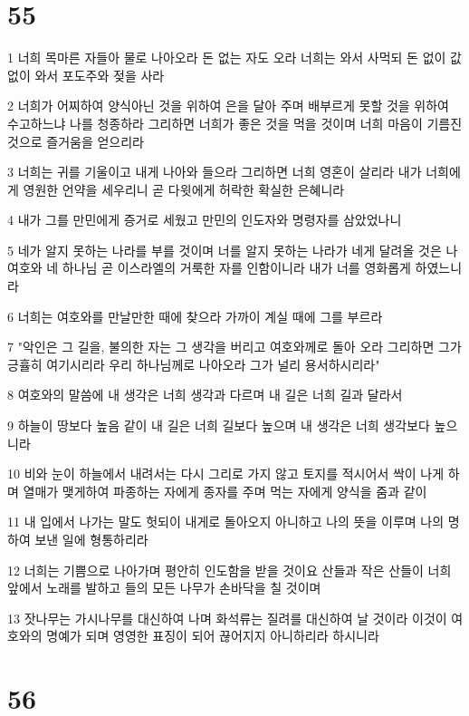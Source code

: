 \chapter{55}

\par 1 너희 목마른 자들아 물로 나아오라 돈 없는 자도 오라 너희는 와서 사먹되 돈 없이 값 없이 와서 포도주와 젖을 사라
\par 2 너희가 어찌하여 양식아닌 것을 위하여 은을 달아 주며 배부르게 못할 것을 위하여 수고하느냐 나를 청종하라 그리하면 너희가 좋은 것을 먹을 것이며 너희 마음이 기름진 것으로 즐거움을 얻으리라
\par 3 너희는 귀를 기울이고 내게 나아와 들으라 그리하면 너희 영혼이 살리라 내가 너희에게 영원한 언약을 세우리니 곧 다윗에게 허락한 확실한 은혜니라
\par 4 내가 그를 만민에게 증거로 세웠고 만민의 인도자와 명령자를 삼았었나니
\par 5 네가 알지 못하는 나라를 부를 것이며 너를 알지 못하는 나라가 네게 달려올 것은 나 여호와 네 하나님 곧 이스라엘의 거룩한 자를 인함이니라 내가 너를 영화롭게 하였느니라
\par 6 너희는 여호와를 만날만한 때에 찾으라 가까이 계실 때에 그를 부르라
\par 7 "악인은 그 길을, 불의한 자는 그 생각을 버리고 여호와께로 돌아 오라 그리하면 그가 긍휼히 여기시리라 우리 하나님께로 나아오라 그가 널리 용서하시리라"
\par 8 여호와의 말씀에 내 생각은 너희 생각과 다르며 내 길은 너희 길과 달라서
\par 9 하늘이 땅보다 높음 같이 내 길은 너희 길보다 높으며 내 생각은 너희 생각보다 높으니라
\par 10 비와 눈이 하늘에서 내려서는 다시 그리로 가지 않고 토지를 적시어서 싹이 나게 하며 열매가 맺게하여 파종하는 자에게 종자를 주며 먹는 자에게 양식을 줌과 같이
\par 11 내 입에서 나가는 말도 헛되이 내게로 돌아오지 아니하고 나의 뜻을 이루며 나의 명하여 보낸 일에 형통하리라
\par 12 너희는 기쁨으로 나아가며 평안히 인도함을 받을 것이요 산들과 작은 산들이 너희 앞에서 노래를 발하고 들의 모든 나무가 손바닥을 칠 것이며
\par 13 잣나무는 가시나무를 대신하여 나며 화석류는 질려를 대신하여 날 것이라 이것이 여호와의 명예가 되며 영영한 표징이 되어 끊어지지 아니하리라 하시니라

\chapter{56}

